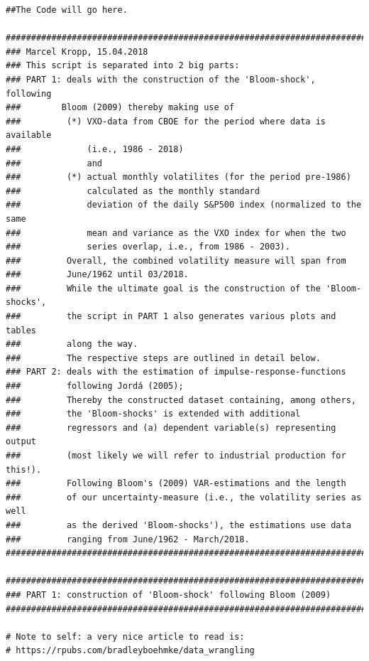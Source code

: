 \documentclass[a4paper,12pt,oneside,pointednumbers,bibtotoc,bigheadings,liststotoc]{scrbook}
\begin{document}
\begingroup
\fontsize{10pt}{12pt}\selectfont
\begin{verbatim}  
##The Code will go here.

########################################################################
### Marcel Kropp, 15.04.2018
### This script is separated into 2 big parts:
### PART 1: deals with the construction of the 'Bloom-shock', following 
###        Bloom (2009) thereby making use of 
###         (*) VXO-data from CBOE for the period where data is available 
###             (i.e., 1986 - 2018)
###             and 
###         (*) actual monthly volatilites (for the period pre-1986) 
###             calculated as the monthly standard 
###             deviation of the daily S&P500 index (normalized to the same 
###             mean and variance as the VXO index for when the two
###             series overlap, i.e., from 1986 - 2003).
###         Overall, the combined volatility measure will span from
###         June/1962 until 03/2018.
###         While the ultimate goal is the construction of the 'Bloom-shocks',
###         the script in PART 1 also generates various plots and tables
###         along the way.
###         The respective steps are outlined in detail below.
### PART 2: deals with the estimation of impulse-response-functions
###         following Jordá (2005);
###         Thereby the constructed dataset containing, among others,
###         the 'Bloom-shocks' is extended with additional 
###         regressors and (a) dependent variable(s) representing output
###         (most likely we will refer to industrial production for this!).
###         Following Bloom's (2009) VAR-estimations and the length
###         of our uncertainty-measure (i.e., the volatility series as well
###         as the derived 'Bloom-shocks'), the estimations use data
###         ranging from June/1962 - March/2018.
########################################################################

########################################################################
### PART 1: construction of 'Bloom-shock' following Bloom (2009)
########################################################################

# Note to self: a very nice article to read is:
# https://rpubs.com/bradleyboehmke/data_wrangling


\end{verbatim}
\end{document}
